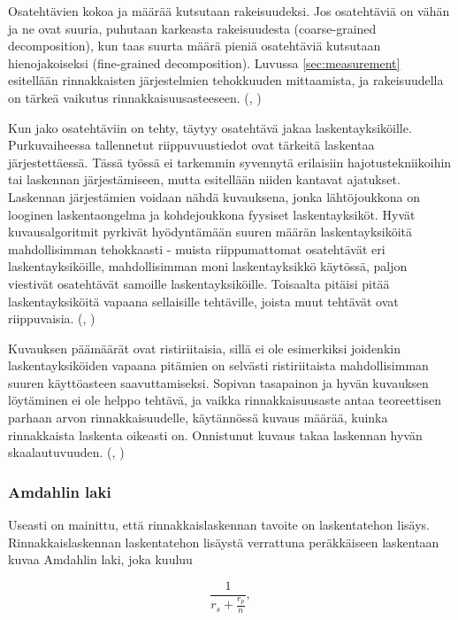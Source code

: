 Osatehtävien kokoa ja määrää kutsutaan rakeisuudeksi. Jos osatehtäviä on vähän
ja ne ovat suuria, puhutaan karkeasta rakeisuudesta (coarse-grained
decomposition), kun taas suurta määrä pieniä osatehtäviä kutsutaan
hienojakoiseksi (fine-grained decomposition). Luvussa \ref{sec:measurement}
esitellään rinnakkaisten järjestelmien tehokkuuden mittaamista, ja rakeisuudella
on tärkeä vaikutus rinnakkaisuusasteeseen. (\citealt{intro}, \citealt{rauber})

Kun jako osatehtäviin on tehty, täytyy osatehtävä jakaa laskentayksiköille.
Purkuvaiheessa tallennetut riippuvuustiedot ovat tärkeitä laskentaa
järjestettäessä. Tässä työssä ei tarkemmin syvennytä erilaisiin
hajotustekniikoihin tai laskennan järjestämiseen, mutta esitellään niiden
kantavat ajatukset. Laskennan järjestämien voidaan nähdä kuvauksena, jonka
lähtöjoukkona on looginen laskentaongelma ja kohdejoukkona fyysiset laskentayksiköt.
Hyvät kuvausalgoritmit pyrkivät hyödyntämään suuren määrän laskentayksiköitä
mahdollisimman tehokkaasti - muista riippumattomat osatehtävät eri
laskentayksiköille, mahdollisimman moni laskentayksikkö käytössä,
paljon viestivät osatehtävät samoille laskentayksiköille.
Toisaalta pitäisi pitää laskentayksiköitä vapaana sellaisille tehtäville,
joista muut tehtävät ovat riippuvaisia. (\citealt{intro}, \citealt{rauber})

Kuvauksen päämäärät ovat ristiriitaisia, sillä
ei ole esimerkiksi joidenkin laskentayksiköiden vapaana pitämien on selvästi
ristiriitaista mahdollisimman suuren käyttöasteen saavuttamiseksi. Sopivan
tasapainon ja hyvän kuvauksen löytäminen ei ole helppo tehtävä, ja vaikka
rinnakkaisuusaste antaa teoreettisen parhaan arvon rinnakkaisuudelle,
käytännössä kuvaus määrää, kuinka rinnakkaista laskenta oikeasti on.
Onnistunut kuvaus takaa laskennan hyvän skaalautuvuuden.
(\citealt{intro}, \citealt{rauber})

\subsubsection{Amdahlin laki}
\label{sec:amdahl}

Useasti on mainittu, että rinnakkaislaskennan tavoite on laskentatehon
lisäys. Rinnakkaislaskennan laskentatehon lisäystä verrattuna peräkkäiseen
laskentaan kuvaa Amdahlin laki, joka kuuluu

\begin{center}
\begin{equation}\frac{1}{r_s + \frac{r_p}{n}},\end{equation}
\end{center}

